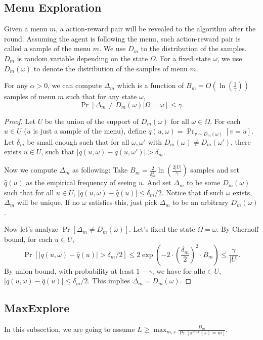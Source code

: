 \subsection{Menu Exploration}
\label{sec:private_menu}
Given a menu $m$, a action-reward pair will be revealed to the algorithm after the round. Assuming the agent is following the menu, such action-reward pair is called a sample of the menu $m$. We use $D_m$ to the distribution of the samples. $D_m$ is random variable depending on the state $\Omega$. For a fixed state $\omega$, we use $D_m(\omega)$ to denote the distribution of the samples of menu $m$. 

\begin{lemma}
\label{lem:deltam}
For any $\alpha > 0$, we can compute $\Delta_m$ which is a function of $B_m = O\left(\ln\left(\frac{1}{\gamma}\right)\right)$ samples of menu $m$ such that for any state $\omega$, 
\[
\Pr[\Delta_m \neq D_m(\omega) | \Omega = \omega] \leq \gamma.
\]
\end{lemma}

\begin{proof}
Let $U$ be the union of the support of $D_m(\omega)$ for all $\omega \in \varOmega$. For each $u \in U$ ($u$ is just a sample of the menu), define $q(u,\omega) = \Pr_{v \sim D_m(\omega)}[v = u]$. Let $\delta_m$ be small enough such that for all $\omega, \omega'$ with $D_m(\omega) \neq D_m(\omega')$, there exists $u \in U$, such that $|q(u,\omega) - q(u,\omega')| > \delta_m$. 

Now we compute $\Delta_m$ as following: Take $B_m = \frac{2}{\delta_m^2}\ln\left(\frac{2|U|}{\gamma}\right) $ samples and set $\hat{q}(u)$ as the empirical frequency of seeing $u$. And set $\Delta_m$ to be some $D_m(\omega)$ such that for all $u \in U$, $|q(u,\omega) - \hat{q}(u)| \leq \delta_m / 2$. Notice that if such $\omega$ exists, $\Delta_m$ will be unique. If no $\omega$ satisfies this, just pick $\Delta_m$ to be an arbitrary $D_m(\omega)$. 

Now let's analyze $\Pr[\Delta_m \neq D_m(\omega)]$. Let's fixed the state $\Omega = \omega$. By Chernoff bound, for each $u \in U$, 
\[
\Pr[|q(u,\omega) -\hat{q}(u)| > \delta_m/2] \leq 2\exp\left(-2 \cdot \left(\frac{\delta_m}{2}\right)^2 \cdot B_m\right) \leq \frac{\gamma}{|U|}.
\]
By union bound, with probability at least $1-\gamma$, we have for all$u \in U$, $|q(u,\omega) - \hat{q}(u)| \leq \delta_m / 2$. This implies $\Delta_m = D_m(\omega)$. 
\end{proof}


\subsection{MaxExplore}
\label{sec:private_maxe}
In this subsection, we are going to assume $L \geq \max_{m,s} \frac{B_m}{ \Pr[\pi^{max}(s)=m]}$. 

